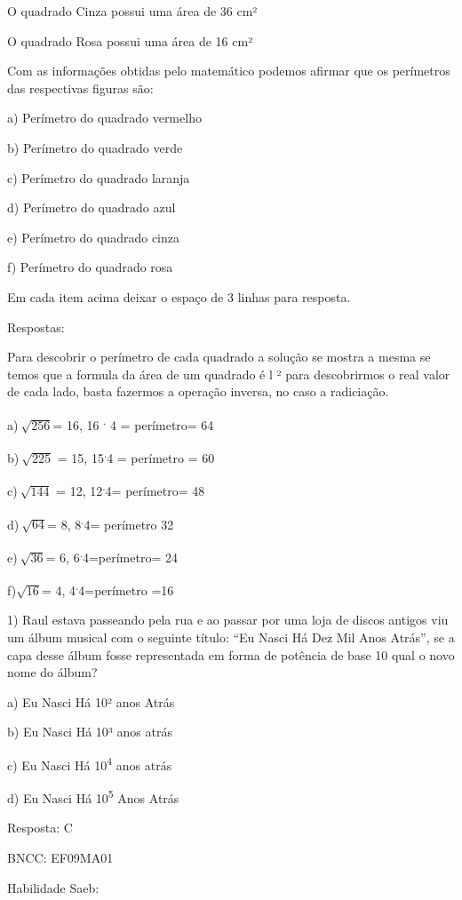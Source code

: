 O quadrado Cinza possui uma área de 36 cm²

O quadrado Rosa possui uma área de 16 cm²

Com as informações obtidas pelo matemático podemos afirmar que os
perímetros das respectivas figuras são:

a) Perímetro do quadrado vermelho

b) Perímetro do quadrado verde

c) Perímetro do quadrado laranja

d) Perímetro do quadrado azul

e) Perímetro do quadrado cinza

f) Perímetro do quadrado rosa

Em cada item acima deixar o espaço de 3 linhas para resposta.

Respostas:

Para descobrir o perímetro de cada quadrado a solução se mostra a mesma
se temos que a formula da área de um quadrado é l ² para descobrirmos o
real valor de cada lado, basta fazermos a operação inversa, no caso a
radiciação.

a)\(\ \sqrt{256}\)= 16, 16 \textsuperscript{.} 4 = perímetro= 64

b)\(\ \sqrt{225}\) = 15, 15\textsuperscript{.}4 = perímetro = 60

c)\(\ \sqrt{144}\) = 12, 12\textsuperscript{.}4= perímetro= 48

d)\(\ \sqrt{64}\)= 8, 8\textsuperscript{.}4= perímetro 32

e)\(\ \sqrt{36}\)= 6, 6\textsuperscript{.}4=perímetro= 24

f)\(\sqrt{16}\)= 4, 4\textsuperscript{.}4=perímetro =16


1) Raul estava passeando pela rua e ao passar por uma loja de discos
antigos viu um álbum musical com o seguinte título: ``Eu Nasci Há Dez
Mil Anos Atrás'', se a capa desse álbum fosse representada em forma de
potência de base 10 qual o novo nome do álbum?

a) Eu Nasci Há 10² anos Atrás

b) Eu Nasci Há 10³ anos atrás

c) Eu Nasci Há 10\textsuperscript{4} anos atrás

d) Eu Nasci Há 10\textsuperscript{5} Anos Atrás

Resposta: C

BNCC: EF09MA01

Habilidade Saeb:

